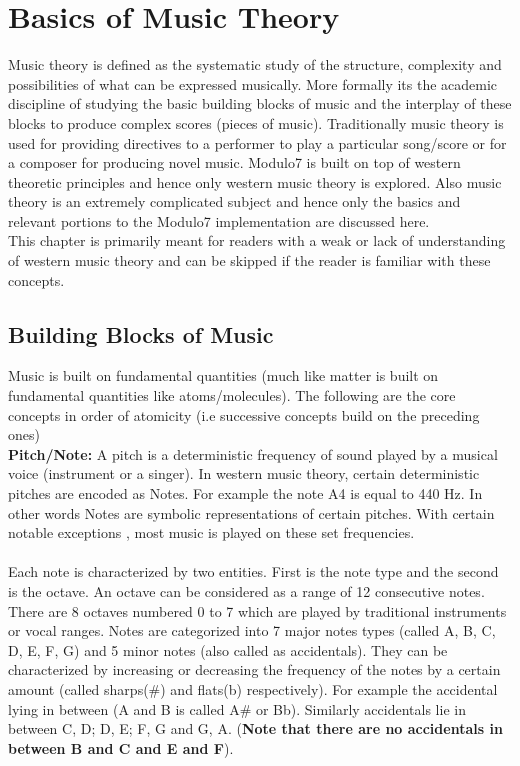 \chapter{Basics of Music Theory}
\label{sec:music theory}

\noindent Music theory is defined as the systematic study of the structure, complexity and possibilities of what can be expressed musically. More formally its the academic discipline of studying the basic building blocks of music and the interplay of these blocks to produce complex scores (pieces of music). Traditionally music theory is used for providing directives to a performer to play a particular song/score or for a composer for producing novel music. Modulo7 is built on top of western theoretic principles and hence only western music theory is explored. Also music theory is an extremely complicated subject and hence only the basics and relevant portions to the Modulo7 implementation are discussed here. \\

\noindent This chapter is primarily meant for readers with a weak or lack of understanding of western music theory and can be skipped if the reader is familiar with these concepts. 

\section{Building Blocks of Music}

\noindent Music is built on fundamental quantities (much like matter is built on fundamental quantities like atoms/molecules). The following are the core concepts in order of atomicity (i.e successive concepts build on the preceding ones)\\

\noindent \textbf{Pitch/Note: }\label{pitch} A pitch is a deterministic frequency of sound played by a musical voice (instrument or a singer). In western music theory, certain deterministic pitches are encoded as Notes. For example the note A4 is equal to 440 Hz. In other words Notes are symbolic representations of certain pitches. With certain notable exceptions \cite{microtonalmusic}, most music is played on these set frequencies. \\\\
Each note is characterized by two entities. First is the note type and the second is the octave. An octave can be considered as a range of 12 consecutive notes. There are 8 octaves numbered 0 to 7 which are played by traditional instruments or vocal ranges. Notes are categorized into 7 major notes types (called A, B, C, D, E, F, G) and 5 minor notes (also called as accidentals). They can be characterized by increasing or decreasing the frequency of the notes by a certain amount (called sharps(\#) and flats(b) respectively). For example the accidental lying in between (A and B is called A\# or Bb). Similarly accidentals lie in between C, D; D, E; F, G and G, A. (\textbf{Note that there are no accidentals in between B and C and E and F}). \\

